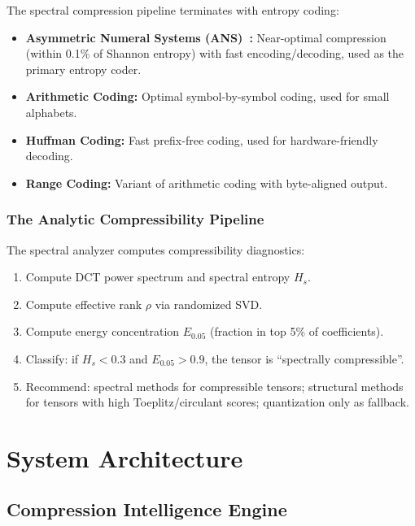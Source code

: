 \documentclass[11pt,a4paper,openright]{book}
\begin{document}
The spectral compression pipeline terminates with entropy coding:

\begin{itemize}
	\item \textbf{Asymmetric Numeral Systems (ANS)~\cite{duda2015asymmetric}:} Near-optimal compression (within 0.1\% of Shannon entropy) with fast encoding/decoding, used as the primary entropy coder.
	\item \textbf{Arithmetic Coding:} Optimal symbol-by-symbol coding, used for small alphabets.
	\item \textbf{Huffman Coding:} Fast prefix-free coding, used for hardware-friendly decoding.
	\item \textbf{Range Coding:} Variant of arithmetic coding with byte-aligned output.
\end{itemize}

\section{The Analytic Compressibility Pipeline}

The spectral analyzer computes compressibility diagnostics:

\begin{enumerate}
	\item Compute DCT power spectrum and spectral entropy $H_s$.
	\item Compute effective rank $\rho$ via randomized SVD.
	\item Compute energy concentration $E_{0.05}$ (fraction in top 5\% of coefficients).
	\item Classify: if $H_s < 0.3$ and $E_{0.05} > 0.9$, the tensor is ``spectrally compressible''.
	\item Recommend: spectral methods for compressible tensors; structural methods for tensors with high Toeplitz/circulant scores; quantization only as fallback.
\end{enumerate}

\part{System Architecture}

\chapter{Compression Intelligence Engine}
\label{ch:engine}
\end{document}
